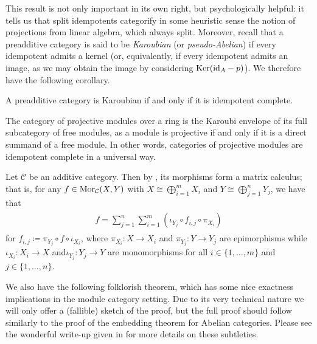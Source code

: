 \noindent This result is not only important in its own right, but psychologically helpful: it tells us that split idempotents categorify in some heuristic sense the notion of projections from linear algebra, which always split. Moreover, recall that a preadditive category is said to be {\em Karoubian} (or {\em pseudo-Abelian}) if every idempotent admits a kernel (or, equivalently, if every idempotent admits an image, as we may obtain the image by considering $\textup{Ker}(\textup{id}_A - p)$). We therefore have the following corollary.\\

\noindent\begin{corollary} A preadditive category is Karoubian if and only if it is idempotent complete.\\
\end{corollary}

\noindent\begin{example} The category of projective modules over a ring is the Karoubi envelope of its full subcategory of free modules, as a module is projective if and only if it is a direct summand of a free module. In other words, categories of projective modules are idempotent complete in a universal way.\\
\end{example}

\noindent\begin{remark}\label{MatrixCalculus} Let $\mathcal{C}$ be an additive category. Then by \cite[\S VIII.2]{Mac13}, its morphisms form a matrix calculus; that is, for any $f \in \textup{Mor}_\mathcal{C}(X, Y)$ with $X \cong \bigoplus_{i=1}^m{X_i}$ and $Y \cong \bigoplus_{j=1}^n{Y_j}$, we have that\\[-\linespacing]
\begin{align*}
\begin{split}
f = \sum_{j=1}^n{\sum_{i=1}^m{(\iota_{Y_j} \circ f_{i,j} \circ \pi_{X_i})}}
\end{split}
\end{align*}
\noindent for $f_{i,j} \coloneqq \pi_{Y_j} \circ f \circ \iota_{X_i}$, where $\pi_{X_i} : X \to X_i$ and $\pi_{Y_j} : Y \to Y_j$ are epimorphisms while $\iota_{X_i} : X_i \to X$ and\linebreak $\iota_{Y_j} : Y_j \to Y$ are monomorphisms for all $i \in \{1, \dots, m\}$ and $j \in \{1, \dots, n\}$.\\
\end{remark}

\noindent We also have the following folklorish theorem, which has some nice exactness implications in the module category setting. Due to its very technical nature we will only offer a (fallible) sketch of the proof, but the full proof should follow similarly to the proof of the embedding theorem for Abelian categories. Please see the wonderful write-up given in \cite{Jun19} for more details on these subtleties.\\

